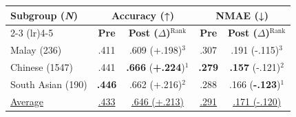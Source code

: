 \begin{tabular}{@{} l | c c | c c @{}}
\toprule
\multirow{2}{*}{\textbf{Subgroup (\textbf{\textit{N}})}} & \multicolumn{2}{c|}{\textbf{Accuracy (↑)}} & \multicolumn{2}{c}{\textbf{NMAE (↓)}} \\
\cmidrule(lr){2-3} \cmidrule(lr){4-5}
& \textbf{Pre} & \textbf{Post ($\Delta$)}$^{\text{Rank}}$ & \textbf{Pre} & \textbf{Post ($\Delta$)}$^{\text{Rank}}$ \\
\midrule
Malay (236) & .411 & .609 (+.198)$^{3}$ & .307 & .191 (-.115)$^{3}$ \\
Chinese (1547) & .441 & \textbf{.666} (\textbf{+.224})$^{1}$ & \textbf{.279} & \textbf{.157} (-.121)$^{2}$ \\
South Asian (190) & \textbf{.446} & .662 (+.216)$^{2}$ & .288 & .166 (\textbf{-.123})$^{1}$ \\
\midrule
\underline{Average} & \underline{.433} & \underline{.646 (+.213)} & \underline{.291} & \underline{.171 (-.120)} \\
\bottomrule
\end{tabular}
